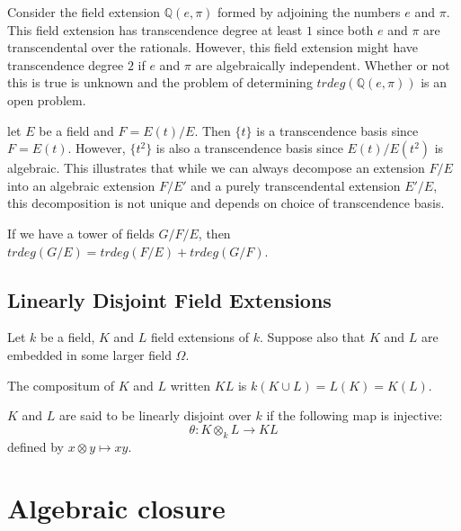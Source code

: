 \begin{example} Consider the field extension $\mathbb{Q}(e,\pi)$ formed by
adjoining the numbers $e$ and $\pi$. This field extension has transcendence
degree at least $1$ since both $e$ and $\pi$ are transcendental over the
rationals. However, this field extension might have transcendence degree $2$ if
$e$ and $\pi$ are algebraically independent. Whether or not this is true is
unknown and the problem of determining $trdeg(\mathbb{Q}(e,\pi))$ is an open
problem.\end{example}
\begin{example} let $E$ be a field and $F=E(t)/E$. Then $\{t\}$ is a
transcendence basis since $F=E(t)$. However, $\{t^2\}$ is also a transcendence
basis since $E(t)/E(t^2)$ is algebraic. This illustrates that while we can
always decompose an extension $F/E$ into an algebraic extension $F/E'$ and a
purely transcendental extension $E'/E$, this decomposition is not unique and
depends on choice of transcendence basis. \end{example}
\begin{exercise} If we have a tower of fields $G/F/E$, then $trdeg(G/E)=trdeg(F/E)+trdeg(G/F)$. \end{exercise}

\subsection{Linearly Disjoint Field Extensions}
Let $k$ be a field, $K$ and $L$ field extensions of $k$. Suppose also that $K$ and $L$ are embedded in some larger field $\Omega$. 

\begin{definition} The compositum of $K$ and $L$ written $KL$ is $k(K\cup L)=L(K)=K(L)$. 
\end{definition}



\begin{definition} $K$ and $L$ are said to be linearly disjoint over $k$ if the following map is injective:
\begin{equation} \theta: K\otimes_k L\rightarrow KL \end{equation} defined by $x\otimes y\mapsto xy$. 
\end{definition}


\section{Algebraic closure}

